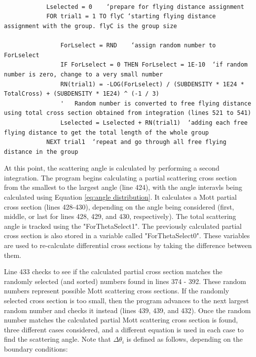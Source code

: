 \documentclass[10pt, reqno]{exam}
\begin{document}
\begin{verbatim}
    
    
    
            Lselected = 0    ‘prepare for flying distance assignment
            FOR trial1 = 1 TO flyC ‘starting flying distance assignment with the group. flyC is the group size
    
                ForLselect = RND    ‘assign random number to ForLselect
                IF ForLselect = 0 THEN ForLselect = 1E-10  ‘if random number is zero, change to a very small number
                RN(trial1) = -LOG(ForLselect) / (SUBDENSITY * 1E24 * TotalCross) + (SUBDENSITY * 1E24) ^ (-1 / 3)
                '   Random number is converted to free flying distance using total cross section obtained from integration (lines 521 to 541)
                Lselected = Lselected + RN(trial1)  ‘adding each free flying distance to get the total length of the whole group
            NEXT trial1  ‘repeat and go through all free flying distance in the group
\end{verbatim}

At this point, the scattering angle is calculated by performing a second integration. The program begins calculating a partial scattering cross section from the smallest to the largest angle (line 424), with the angle interavls being calculated using Equation \ref{eq:angle distribution}. It calculates a Mott partial cross section (lines 428-430), depending on the angle being considered (first, middle, or last for lines 428, 429, and 430, respectively). The total scattering angle is tracked using the "ForThetaSelect1". The previously calculated partial cross section is also stored in a variable called "ForThetaSelect0". These variables are used to re-calculate differential cross sections by taking the difference between them. \par

\vspace{0.5 cm}

Line 433 checks to see if the calculated partial cross section matches the randomly selected (and sorted) numbers found in lines 374 - 392. These random numbers represent possible Mott scattering cross sections. If the randomly selected cross section is too small, then the program advances to the next largest random number and checks it instead (lines 439, 439, and 432). Once the random number matches the calculated partial Mott scattering cross section is found, three different cases considered, and a different equation is used in each case to find the scattering angle. Note that $\Delta \theta_{i}$ is defined as follows, depending on the boundary conditions: \par
\end{document}
